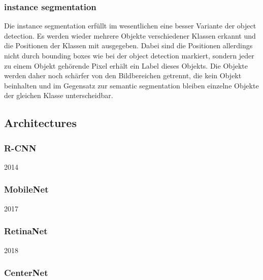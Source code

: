 \documentclass[
			   fontsize=11pt,
               paper=a4,
               bibliography=totoc,
               idxtotoc,
               headsepline,
               footsepline,
               footinclude=false,
               BCOR=12mm,
               DIV=13,
               openany,   %
               ]
               {scrbook}
\begin{document}
\subsubsection{instance segmentation}
Die instance segmentation erfüllt im wesentlichen eine besser Variante der object detection. Es werden wieder mehrere Objekte verschiedener Klassen erkannt und die Positionen der Klassen mit ausgegeben. Dabei sind die Positionen allerdings nicht durch bounding boxes wie bei der object detection markiert, sondern jeder zu einem Objekt gehörende Pixel erhält ein Label dieses Objekts. Die Objekte werden daher noch schärfer von den Bildbereichen getrennt, die kein Objekt beinhalten und im Gegensatz zur semantic segmentation bleiben einzelne Objekte der gleichen Klasse unterscheidbar.



\subsection{Architectures}



\subsubsection{R-CNN}

2014
\cite{rcnnIntro}




\subsubsection{MobileNet}

2017


\subsubsection{RetinaNet}

2018


\subsubsection{CenterNet}
\end{document}
